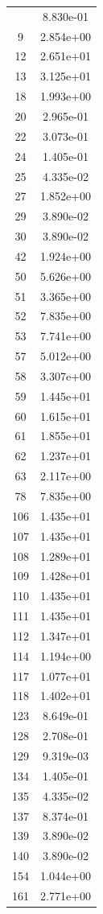 \documentclass[12pt]{article}
\begin{document}
\begin{longtable}{@{}cc@{}}
\bottomrule
\endlastfoot
7 & 8.830e-01 \\
9 & 2.854e+00 \\
12 & 2.651e+01 \\
13 & 3.125e+01 \\
18 & 1.993e+00 \\
20 & 2.965e-01 \\
22 & 3.073e-01 \\
24 & 1.405e-01 \\
25 & 4.335e-02 \\
27 & 1.852e+00 \\
29 & 3.890e-02 \\
30 & 3.890e-02 \\
42 & 1.924e+00 \\
50 & 5.626e+00 \\
51 & 3.365e+00 \\
52 & 7.835e+00 \\
53 & 7.741e+00 \\
57 & 5.012e+00 \\
58 & 3.307e+00 \\
59 & 1.445e+01 \\
60 & 1.615e+01 \\
61 & 1.855e+01 \\
62 & 1.237e+01 \\
63 & 2.117e+00 \\
78 & 7.835e+00 \\
106 & 1.435e+01 \\
107 & 1.435e+01 \\
108 & 1.289e+01 \\
109 & 1.428e+01 \\
110 & 1.435e+01 \\
111 & 1.435e+01 \\
112 & 1.347e+01 \\
114 & 1.194e+00 \\
117 & 1.077e+01 \\
118 & 1.402e+01 \\
123 & 8.649e-01 \\
128 & 2.708e-01 \\
129 & 9.319e-03 \\
134 & 1.405e-01 \\
135 & 4.335e-02 \\
137 & 8.374e-01 \\
139 & 3.890e-02 \\
140 & 3.890e-02 \\
154 & 1.044e+00 \\
161 & 2.771e+00 \\

\end{longtable}
\end{document}
